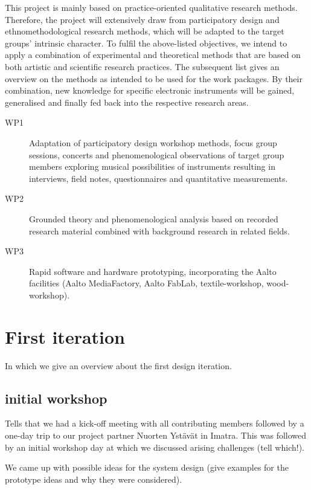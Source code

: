 \documentclass{chi-ext}
\begin{document}
\begin{multicols}{2}
This project is mainly based on practice-oriented qualitative research methods. Therefore, the project will extensively draw from participatory design and ethnomethodological research methods, which will be adapted to the target groups’ intrinsic character. To fulfil the above-listed objectives, we intend to apply a combination of experimental and theoretical methods that are based on both artistic and scientific research practices. The subsequent list gives an overview on the methods as intended to be used for the work packages. By their combination, new knowledge for specific electronic instruments will be gained, generalised and finally fed back into the respective research areas.

\begin{description}
	\item[WP1] Adaptation of participatory design workshop methods, focus group sessions, concerts and phenomenological observations of target group members exploring musical possibilities of instruments resulting in interviews, field notes, questionnaires and quantitative measurements.
	\item[WP2] Grounded theory and phenomenological analysis based on recorded research material combined with background research in related fields.
	\item[WP3] Rapid software and hardware prototyping, incorporating the Aalto facilities (Aalto MediaFactory, Aalto FabLab, textile-workshop, wood-workshop).
\end{description}





\section{First iteration}
\label{sec:first_iteration}

In which we give an overview about the first design iteration.

\subsection{initial workshop}
\label{sub:initial_workshop}

Tells that we had a kick-off meeting with all contributing members followed by a one-day trip to our project partner Nuorten Ystävät in Imatra.
This was followed by an initial workshop day at which we discussed arising challenges (tell which!).

We came up with possible ideas for the system design (give examples for the prototype ideas and why they were considered).



\end{multicols}
\end{document}

